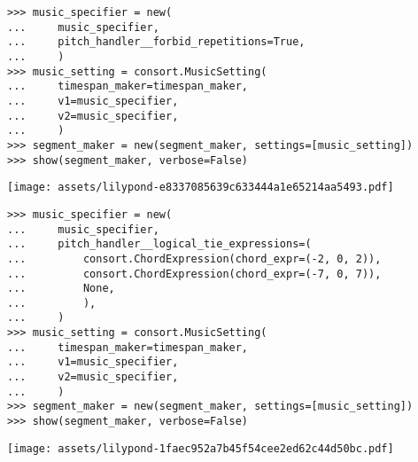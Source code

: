 \begin{abjadbookoutput}
\begin{singlespacing}
\vspace{-0.5\baselineskip}
\begin{lstlisting}
>>> music_specifier = new(
...     music_specifier,
...     pitch_handler__forbid_repetitions=True,
...     )
>>> music_setting = consort.MusicSetting(
...     timespan_maker=timespan_maker,
...     v1=music_specifier,
...     v2=music_specifier,
...     )
>>> segment_maker = new(segment_maker, settings=[music_setting])
>>> show(segment_maker, verbose=False)
\end{lstlisting}
\noindent\texttt{[image: assets/lilypond-e8337085639c633444a1e65214aa5493.pdf]}
\end{singlespacing}
\end{abjadbookoutput}

\begin{comment}
<abjad>[stylesheet=../consort.ily]
music_specifier = new(
    music_specifier,
    pitch_handler__logical_tie_expressions=(
        consort.ChordExpression(chord_expr=(-2, 0, 2)),
        consort.ChordExpression(chord_expr=(-7, 0, 7)),
        None,
        ),
    )
music_setting = consort.MusicSetting(
    timespan_maker=timespan_maker,
    v1=music_specifier,
    v2=music_specifier,
    )
segment_maker = new(segment_maker, settings=[music_setting])
show(segment_maker, verbose=False)
</abjad>
\end{comment}

\begin{abjadbookoutput}
\begin{singlespacing}
\vspace{-0.5\baselineskip}
\begin{lstlisting}
>>> music_specifier = new(
...     music_specifier,
...     pitch_handler__logical_tie_expressions=(
...         consort.ChordExpression(chord_expr=(-2, 0, 2)),
...         consort.ChordExpression(chord_expr=(-7, 0, 7)),
...         None,
...         ),
...     )
>>> music_setting = consort.MusicSetting(
...     timespan_maker=timespan_maker,
...     v1=music_specifier,
...     v2=music_specifier,
...     )
>>> segment_maker = new(segment_maker, settings=[music_setting])
>>> show(segment_maker, verbose=False)
\end{lstlisting}
\noindent\texttt{[image: assets/lilypond-1faec952a7b45f54cee2ed62c44d50bc.pdf]}
\end{singlespacing}
\end{abjadbookoutput}


